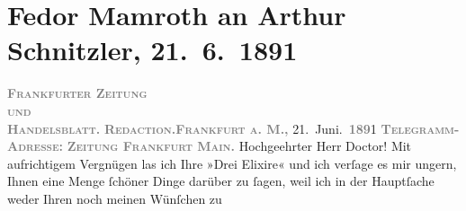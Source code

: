 

         
         \renewcommand{\erwaehntePersonen}{Personen: Karl Bleibtreu, Otto Brahm, Paul Goldmann, Fedor Mamroth}
         \renewcommand{\erwaehnteInstitutionen}{Institutionen: Carl Krabbe, Frankfurter Zeitung, Gil Blas, L’Écho de Paris}
         \renewcommand{\erwaehnteOrte}{Orte: Brüssel, Deutschland, Frankfurt am Main, Wien}
         \renewcommand{\erwaehnteWerke}{Werke: Die drei Elixire, Dies Irae. Erinnerungen eines französischen Offiziers an die Tage von Sedan, Frankfurter Zeitung, Freie Bühne für modernes Leben}
               \section[Fedor Mamroth an Arthur Schnitzler, 21. 6. 1891]{ Fedor Mamroth an Arthur Schnitzler, 21. 6. 1891}\nopagebreak{}\rehead{ }\begin{ledgroupsized}[t]{13cm}\normalsize\beginnumbering \toendnotes[C]{\smallbreak\pagebreak[2]} 
\toendnotes[C]{\smallbreak}\pstart
           \noindent{}{\pb}\textcolor{gray}{\textbf{\textsc{Frankfurter Zeitung}}}{\\}\textcolor{gray}{\textbf{\textsc{und}}}{\\}\textcolor{gray}{\textbf{\textsc{Handelsblatt.}}}\pend
           \pstart
           \textcolor{gray}{\textbf{\textsc{Redaction.}}}\hfill \textcolor{gray}{\textbf{\textsc{Frankfurt a. M.,}}}{ }21. Juni. \textcolor{gray}{\textbf{\textsc{189}}}1\pend
           \pstart
           \textcolor{gray}{\textbf{\textsc{Telegramm-Adresse:}}}\pend
           \pstart
           \textcolor{gray}{\textbf{\textsc{Zeitung Frankfurt Main.}}}\pend
           \pstart{}Hochgeehrter Herr Doctor!\pend\pstart
           Mit aufrichtigem Vergnügen las ich Ihre »Drei
                  Elixire« und ich verſage es mir ungern, Ihnen eine Menge ſchöner Dinge
               darüber zu ſagen, weil ich in der Hauptſache weder Ihren noch meinen Wünſchen zu

\end{ledgroupsized}
